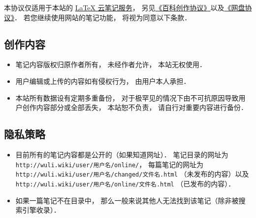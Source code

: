 
本协议仅适用于本站的 \href{http://example.com}{LaTeX 云笔记服务}， 另见\href{http://wuli.wiki/online/licens.html}{《百科创作协议》}以及\href{http://www.example.com}{《网盘协议》}． 若您继续使用网站的笔记功能， 将视为同意以下条款．

\subsection{创作内容}
\begin{itemize}
\item 笔记内容版权归原作者所有， 未经作者允许， 本站无权使用．
\item 用户编辑或上传的内容如有侵权行为， 由用户本人承担．
\item 本站所有数据设有定期多重备份， 对于极罕见的情况下由不可抗原因导致用户创作内容部分或全部丢失， 本站恕不负责， 请自行对重要内容进行备份．
\end{itemize}

\subsection{隐私策略}
\begin{itemize}
\item 目前所有的笔记内容都是公开的（如果知道网址）． 笔记目录的网址为 \verb|http://wuli.wiki/user/用户名/online/|， 每篇笔记的网址为 \verb|http://wuli.wiki/user/用户名/changed/文件名.html| （未发布的内容）以及 \verb|http://wuli.wiki/user/用户名/online/文件名.html| （已发布的内容）．
\item 如果一篇笔记不在目录中， 那么一般来说其他人无法找到该笔记（除非被搜索引擎收录）．
\end{itemize}

